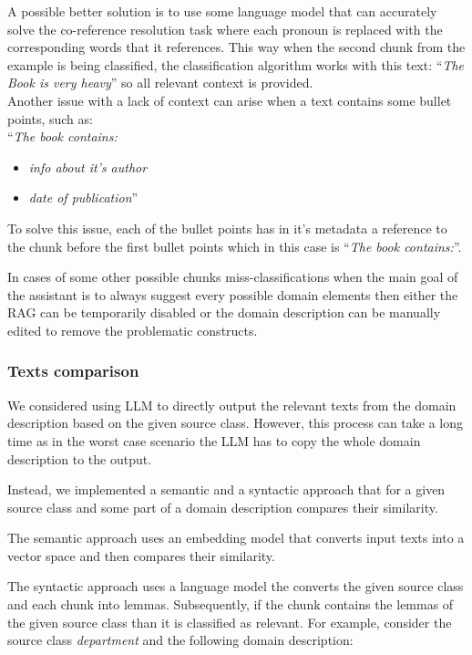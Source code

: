 A possible better solution is to use some language model that can accurately solve the co-reference resolution task where each pronoun is replaced with the corresponding words that it references. This way when the second chunk from the example is being classified, the classification algorithm works with this text: ``\textit{The Book is very heavy}'' so all relevant context is provided. \\

Another issue with a lack of context can arise when a text contains some bullet points, such as: \\

\noindent{}``\textit{The book contains:}
\begin{itemize}
\item \textit{info about it's author}
\item \textit{date of publication}'' \\
\end{itemize}

\noindent{}To solve this issue, each of the bullet points has in it's metadata a reference to the chunk before the first bullet points which in this case is ``\textit{The book contains:}''.

In cases of some other possible chunks miss-classifications when the main goal of the assistant is to always suggest every possible domain elements then either the RAG can be temporarily disabled or the domain description can be manually edited to remove the problematic constructs.


\subsubsection{Texts comparison}
\label{texts_comparison}
  
We considered using LLM to directly output the relevant texts from the domain description based on the given source class. However, this process can take a long time as in the worst case scenario the LLM has to copy the whole domain description to the output.

Instead, we implemented a semantic and a syntactic approach that for a given source class and some part of a domain description compares their similarity.
 
The semantic approach uses an embedding model that converts input texts into a vector space and then compares their similarity.

The syntactic approach uses a language model the converts the given source class and each chunk into lemmas. Subsequently, if the chunk contains the lemmas of the given source class than it is classified as relevant. For example, consider the source class \textit{department} and the following domain description: \\


